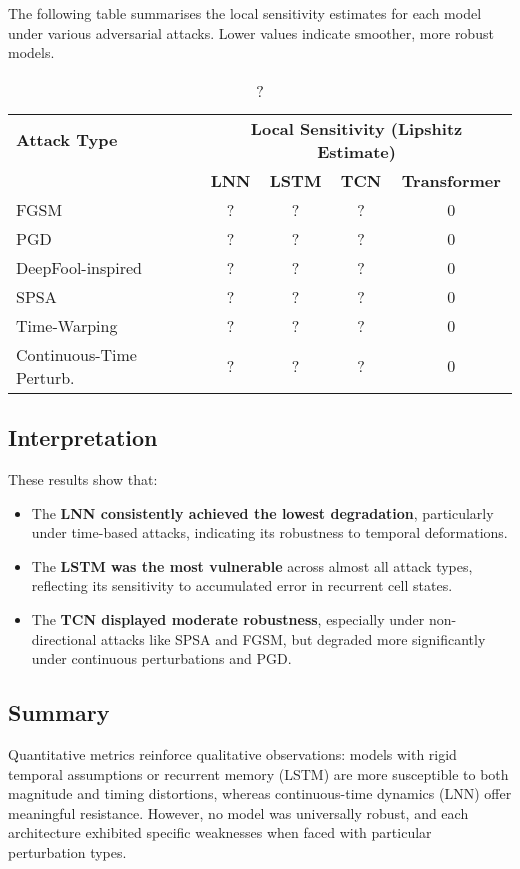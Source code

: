 The following table summarises the local sensitivity estimates for each model under various adversarial attacks. Lower values indicate smoother, more robust models.

\begin{table}[H]
    \centering
    \small
    \begin{tabular}{|l|cccc|}
    \hline
    \textbf{Attack Type} & \multicolumn{4}{c|}{\textbf{Local Sensitivity (Lipshitz Estimate)}} \\
    \cline{2-5}
     & \textbf{LNN} & \textbf{LSTM} & \textbf{TCN} & \textbf{Transformer} \\
    \hline
    FGSM                     & ? & ? & ? & 0 \\
    PGD                      & ? & ? & ? & 0 \\
    DeepFool-inspired        & ? & ? & ? & 0 \\
    SPSA                     & ? & ? & ? & 0 \\
    Time-Warping             & ? & ? & ? & 0 \\
    Continuous-Time Perturb. & ? & ? & ? & 0 \\
    \hline
    \end{tabular}
    \caption{?}
    \label{tab:attack_results_sensitivity}
\end{table}


\subsection{Interpretation}

These results show that:
\begin{itemize}
    \item The \textbf{LNN consistently achieved the lowest degradation}, particularly under time-based attacks, indicating its robustness to temporal deformations.
    \item The \textbf{LSTM was the most vulnerable} across almost all attack types, reflecting its sensitivity to accumulated error in recurrent cell states.
    \item The \textbf{TCN displayed moderate robustness}, especially under non-directional attacks like SPSA and FGSM, but degraded more significantly under continuous perturbations and PGD.
\end{itemize}

\subsection{Summary}
Quantitative metrics reinforce qualitative observations: models with rigid temporal assumptions or recurrent memory (LSTM) are more susceptible to both magnitude and timing distortions, whereas continuous-time dynamics (LNN) offer meaningful resistance. However, no model was universally robust, and each architecture exhibited specific weaknesses when faced with particular perturbation types.

